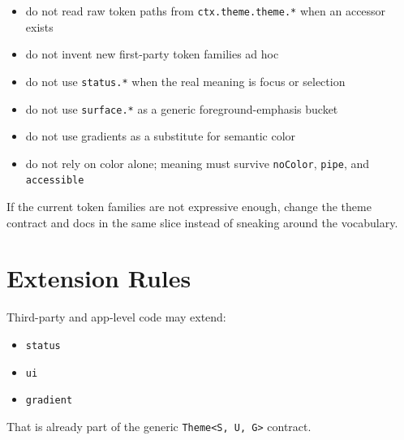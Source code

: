\begin{itemize}
\tightlist
\item
  do not read raw token paths from \texttt{c\allowbreak{}t\allowbreak{}x\allowbreak{}.\allowbreak{}t\allowbreak{}h\allowbreak{}e\allowbreak{}m\allowbreak{}e\allowbreak{}.\allowbreak{}t\allowbreak{}h\allowbreak{}e\allowbreak{}m\allowbreak{}e\allowbreak{}.\allowbreak{}*} when an accessor exists
\item
  do not invent new first-party token families ad hoc
\item
  do not use \texttt{s\allowbreak{}t\allowbreak{}a\allowbreak{}t\allowbreak{}u\allowbreak{}s\allowbreak{}.\allowbreak{}*} when the real meaning is focus or selection
\item
  do not use \texttt{s\allowbreak{}u\allowbreak{}r\allowbreak{}f\allowbreak{}a\allowbreak{}c\allowbreak{}e\allowbreak{}.\allowbreak{}*} as a generic foreground-emphasis bucket
\item
  do not use gradients as a substitute for semantic color
\item
  do not rely on color alone; meaning must survive \texttt{n\allowbreak{}o\allowbreak{}C\allowbreak{}o\allowbreak{}l\allowbreak{}o\allowbreak{}r}, \texttt{p\allowbreak{}i\allowbreak{}p\allowbreak{}e}, and \texttt{a\allowbreak{}c\allowbreak{}c\allowbreak{}e\allowbreak{}s\allowbreak{}s\allowbreak{}i\allowbreak{}b\allowbreak{}l\allowbreak{}e}
\end{itemize}

If the current token families are not expressive enough, change the theme contract and docs in the same slice instead of sneaking around the vocabulary.

\section{Extension Rules}\label{record-028-extension-rules}

Third-party and app-level code may extend:

\begin{itemize}
\tightlist
\item
  \texttt{s\allowbreak{}t\allowbreak{}a\allowbreak{}t\allowbreak{}u\allowbreak{}s}
\item
  \texttt{u\allowbreak{}i}
\item
  \texttt{g\allowbreak{}r\allowbreak{}a\allowbreak{}d\allowbreak{}i\allowbreak{}e\allowbreak{}n\allowbreak{}t}
\end{itemize}

That is already part of the generic \texttt{T\allowbreak{}h\allowbreak{}e\allowbreak{}m\allowbreak{}e\allowbreak{}<\allowbreak{}S\allowbreak{},\allowbreak{} \allowbreak{}U\allowbreak{},\allowbreak{} \allowbreak{}G\allowbreak{}>} contract.

